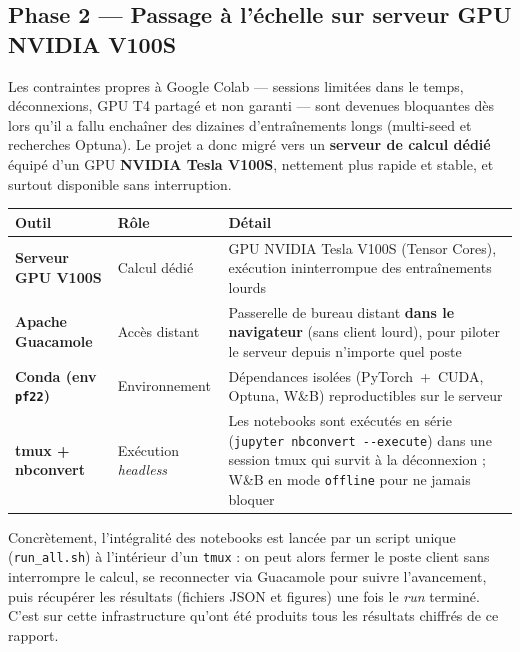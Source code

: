 \documentclass[11pt,a4paper,openany]{book}
\newcommand{\tableheadcolor}{\rowcolor{headerbg}}
\newcommand{\tablerowodd}{}
\begin{document}
\subsection*{Phase 2 — Passage à l'échelle sur serveur GPU NVIDIA V100S}

Les contraintes propres à Google Colab — sessions limitées dans le temps, déconnexions, GPU T4 partagé et non garanti — sont devenues bloquantes dès lors qu'il a fallu enchaîner des dizaines d'entraînements longs (multi-seed et recherches Optuna). Le projet a donc migré vers un \textbf{serveur de calcul dédié} équipé d'un GPU \textbf{NVIDIA Tesla V100S}, nettement plus rapide et stable, et surtout disponible sans interruption.

\vspace{0.4em}
\renewcommand{\arraystretch}{1.4}
\begin{tabularx}{\linewidth}{C{3.2cm} L{3.3cm} L{9.3cm}}
  \toprule
  \tableheadcolor
  \textbf{Outil} &
  \textbf{Rôle} &
  \textbf{Détail} \\
  \midrule
  \tablerowodd
  \textbf{Serveur GPU V100S} & Calcul dédié & GPU NVIDIA Tesla V100S (Tensor Cores), exécution ininterrompue des entraînements lourds \\
  \textbf{Apache Guacamole} & Accès distant & Passerelle de bureau distant \textbf{dans le navigateur} (sans client lourd), pour piloter le serveur depuis n'importe quel poste \\
  \tablerowodd
  \textbf{Conda (env \texttt{pf22})} & Environnement & Dépendances isolées (PyTorch~+~CUDA, Optuna, W\&B) reproductibles sur le serveur \\
  \textbf{tmux + nbconvert} & Exécution \textit{headless} & Les notebooks sont exécutés en série (\texttt{jupyter nbconvert -{}-execute}) dans une session tmux qui survit à la déconnexion ; W\&B en mode \texttt{offline} pour ne jamais bloquer \\
  \bottomrule
\end{tabularx}

\vspace{0.5em}
Concrètement, l'intégralité des notebooks est lancée par un script unique (\texttt{run\_all.sh}) à l'intérieur d'un \texttt{tmux} : on peut alors fermer le poste client sans interrompre le calcul, se reconnecter via Guacamole pour suivre l'avancement, puis récupérer les résultats (fichiers JSON et figures) une fois le \textit{run} terminé. C'est sur cette infrastructure qu'ont été produits tous les résultats chiffrés de ce rapport.
\end{document}
